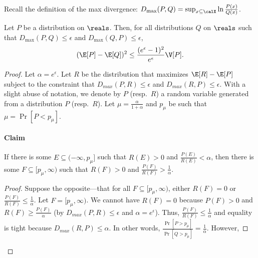 Recall the definition of the max divergence: 
$D_{\max}(P,Q) = \sup_{x \subseteq \calX} \ln \frac{P(x)}{Q(x)}$.
\begin{lemma}\label{lem:dp-var-constr}
Let $P$ be a distribution on $\reals$. Then, for all distributions $Q$ on $\reals$ such that 
$D_{\max}(P,Q) \leq \epsilon$ and $D_{\max}(Q,P) \leq \epsilon$,
\[
(\E[P] - \E[Q])^2 \leq \frac{(e^\epsilon - 1)^2}{e^\epsilon}\V[P].
\]
\end{lemma}
\begin{proof}
Let $\alpha = e^\epsilon$. 
Let $R$ be the distribution that maximizes $\E[R] - \E[P]$ subject to the constraint that 
$D_{max}(P,R) \leq \epsilon$ and $D_{max}(R,P) \leq \epsilon$.
With a slight abuse of notation, we denote by $P$ (resp.~$R$) a random variable
generated from a distribution $P$ (resp.~$R$).
Let $\mu = \frac{\alpha}{1+\alpha}$ and $p_\mu$ be such that $\mu = \Pr[P<p_\mu]$.
\paragraph{Claim} If there is some $E \subseteq (-\infty, p_\mu]$ such that $R(E) > 0$ and $\frac{P(E)}{R(E)} < \alpha$, then there is some $F \subseteq [p_\mu, \infty)$ such that $R(F) > 0$ and $\frac{P(F)}{R(F)} > \frac{1}{\alpha}$.
\begin{proof}
Suppose the opposite---that for all $F \subseteq [p_\mu, \infty)$, either $R(F) = 0$ or $\frac{P(F)}{R(F)} \leq \frac{1}{\alpha}$. Let $F = [p_\mu, \infty)$. We cannot have $R(F) = 0$ because $P(F) > 0$ and 
$R(F) \geq \frac{P(F)}{\alpha}$ 
(by $D_{max}(P,R) \leq \epsilon$ and $\alpha=e^\epsilon$). Thus, $\frac{P(F)}{R(F)} \leq \frac{1}{\alpha}$ and equality is tight because $D_{max}(R,P) \leq \alpha$.
In other words, $\frac{\Pr[P > p_\mu]}{\Pr[Q > p_\mu]} = \frac{1}{\alpha}$. However,


\end{proof}
\end{proof}
